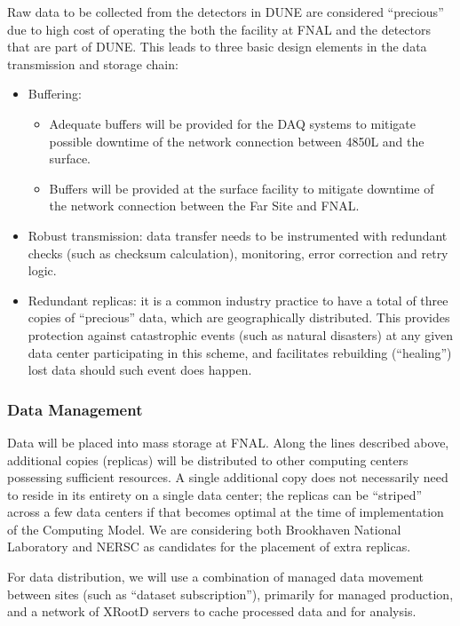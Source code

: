 Raw data to be collected from the detectors in DUNE are considered ``precious'' due to high cost of operating the both the facility at FNAL
and the detectors that are part of DUNE. This leads to three basic design elements in the data transmission and storage chain:
\begin{itemize}
\item Buffering:
\begin{itemize}
\item Adequate buffers will be provided for the DAQ systems  to mitigate possible downtime of the network connection between 4850L and the surface.
\item Buffers will be provided at the surface facility to mitigate downtime of the network connection between the Far Site and FNAL.
\end{itemize}
\item Robust transmission: data transfer needs to be instrumented with redundant checks (such as checksum calculation), monitoring, error correction and retry logic.
\item Redundant replicas: it is a common industry practice to have a total of three copies of ``precious'' data, which are geographically distributed. This provides protection against catastrophic events (such as natural disasters) at any given data center participating in this scheme, and facilitates rebuilding (``healing'')  lost data should such event does happen.
\end{itemize}



\subsubsection{Data Management}
\label{sec:detectors-sc-infrastructure-computing-model-data-mgt}

Data will be placed into mass storage at FNAL. Along the lines described above, additional copies (replicas) will be distributed to other
computing centers possessing sufficient resources.
A single additional copy does not necessarily need to reside in its entirety on a single data center; the replicas can be ``striped'' across a few data centers if that becomes optimal
at the time of implementation of the Computing Model. We are considering both Brookhaven National Laboratory and NERSC as candidates for the placement of extra replicas.

For data distribution, we will use a combination of managed data movement between sites (such as ``dataset subscription''), primarily for managed production, and a network of XRootD
servers to cache processed data and for analysis.


